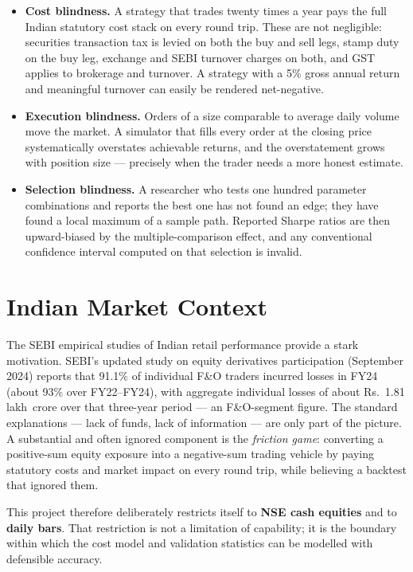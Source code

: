 \documentclass[12pt,a4paper,oneside]{report}
\newcommand{\rupee}{Rs.\ }
\begin{document}
\begin{itemize}[leftmargin=1cm]
    \item \textbf{Cost blindness.} A strategy that trades twenty times a year
    pays the full Indian statutory cost stack on every round trip. These are not
    negligible: securities transaction tax is levied on both the buy and sell
    legs, stamp duty on the buy leg, exchange and SEBI turnover charges on both,
    and GST applies to brokerage and turnover. A strategy with a 5\% gross annual
    return and meaningful turnover can easily be rendered net-negative.
    \item \textbf{Execution blindness.} Orders of a size comparable to average
    daily volume move the market. A simulator that fills every order at the
    closing price systematically overstates achievable returns, and the
    overstatement grows with position size --- precisely when the trader needs a
    more honest estimate.
    \item \textbf{Selection blindness.} A researcher who tests one hundred
    parameter combinations and reports the best one has not found an edge; they
    have found a local maximum of a sample path. Reported Sharpe ratios are then
    upward-biased by the multiple-comparison effect, and any conventional
    confidence interval computed on that selection is invalid.
\end{itemize}

\section{Indian Market Context}

The SEBI empirical studies of Indian retail performance provide a stark
motivation. SEBI's updated study on equity derivatives participation
\cite{sebi2024} (September 2024) reports that 91.1\% of individual F\&O traders incurred losses
in FY24 (about 93\% over FY22--FY24), with aggregate individual losses of about
\rupee{}1.81 lakh~crore over that three-year period --- an F\&O-segment figure.
The standard explanations --- lack of funds, lack of information --- are
only part of the picture. A substantial and often ignored component is the
\emph{friction game}: converting a positive-sum equity exposure into a
negative-sum trading vehicle by paying statutory costs and market impact on
every round trip, while believing a backtest that ignored them.

This project therefore deliberately restricts itself to \textbf{NSE cash
equities} and to \textbf{daily bars}. That restriction is not a limitation of
capability; it is the boundary within which the cost model and validation
statistics can be modelled with defensible accuracy.
\end{document}
